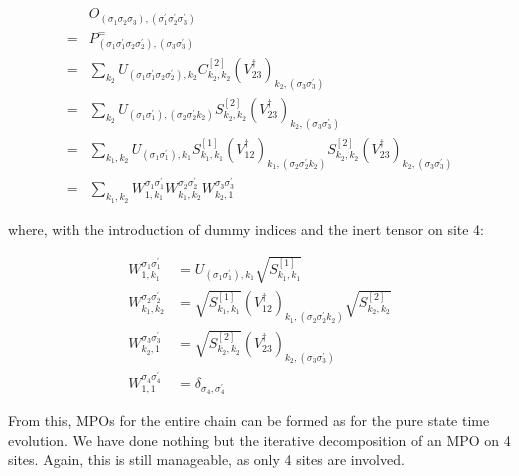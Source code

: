 \documentclass[12pt]{article}
\begin{document}
$$
\begin{aligned}
& O_{\left(\sigma_{1} \sigma_{2} \sigma_{3}\right),\left(\sigma_{1}^{\prime} \sigma_{2}^{\prime} \sigma_{3}^{\prime}\right)} \\
= & P_{\left(\sigma_{1} \sigma_{1}^{\prime} \sigma_{2} \sigma_{2}^{\prime}\right),\left(\sigma_{3} \sigma_{3}^{\prime}\right)}^{=} \\
= & \sum_{k_{2}} U_{\left(\sigma_{1} \sigma_{1}^{\prime} \sigma_{2} \sigma_{2}^{\prime}\right), k_{2}} C_{k_{2}, k_{2}}^{[2]}\left(V_{23}^{\dagger}\right)_{k_{2},\left(\sigma_{3} \sigma_{3}^{\prime}\right)} \\
= & \sum_{k_{2}} U_{\left(\sigma_{1} \sigma_{1}^{\prime}\right),\left(\sigma_{2} \sigma_{2}^{\prime} k_{2}\right)} S_{k_{2}, k_{2}}^{[2]}\left(V_{23}^{\dagger}\right)_{k_{2},\left(\sigma_{3} \sigma_{3}^{\prime}\right)} \\
= & \sum_{k_{1}, k_{2}} U_{\left(\sigma_{1} \sigma_{1}^{\prime}\right), k_{1}} S_{k_{1}, k_{1}}^{[1]}\left(V_{12}^{\dagger}\right)_{k_{1},\left(\sigma_{2} \sigma_{2}^{\prime} k_{2}\right)} S_{k_{2}, k_{2}}^{[2]}\left(V_{23}^{\dagger}\right)_{k_{2},\left(\sigma_{3} \sigma_{3}^{\prime}\right)} \\
= & \sum_{k_{1}, k_{2}} W_{1, k_{1}}^{\sigma_{1} \sigma_{1}^{\prime}} W_{k_{1}, k_{2}}^{\sigma_{2} \sigma_{2}^{\prime}} W_{k_{2}, 1}^{\sigma_{3} \sigma_{3}^{\prime}}
\end{aligned}
$$

where, with the introduction of dummy indices and the inert tensor on site 4:


\begin{align*}
W_{1, k_{1}}^{\sigma_{1} \sigma_{1}^{\prime}} & =U_{\left(\sigma_{1} \sigma_{1}^{\prime}\right), k_{1}} \sqrt{S_{k_{1}, k_{1}}^{[1]}}  \tag{249}\\
W_{k_{1}, k_{2}}^{\sigma_{2} \sigma_{2}^{\prime}} & =\sqrt{S_{k_{1}, k_{1}}^{[1]}}\left(V_{12}^{\dagger}\right)_{k_{1},\left(\sigma_{2} \sigma_{2}^{\prime} k_{2}\right)} \sqrt{S_{k_{2}, k_{2}}^{[2]}}  \tag{250}\\
W_{k_{2}, 1}^{\sigma_{3} \sigma_{3}^{\prime}} & =\sqrt{S_{k_{2}, k_{2}}^{[2]}}\left(V_{23}^{\dagger}\right)_{k_{2},\left(\sigma_{3} \sigma_{3}^{\prime}\right)}  \tag{251}\\
W_{1,1}^{\sigma_{4} \sigma_{4}^{\prime}} & =\delta_{\sigma_{4}, \sigma_{4}^{\prime}} \tag{252}
\end{align*}


From this, MPOs for the entire chain can be formed as for the pure state time evolution. We have done nothing but the iterative decomposition of an MPO on 4 sites. Again, this is still manageable, as only 4 sites are involved.
\end{document}
